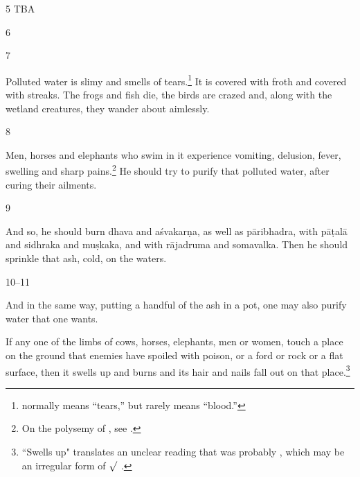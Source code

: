 \begin{translation}
\begin{itemize}
     \end{itemize}
    
    \item[5] TBA
    
    \item [6]
    
    \item[7]
    
    Polluted water is slimy and smells of tears.\footnote{ normally
means “tears,” but rarely means “blood.” }  It is covered with froth and
covered with streaks. The frogs and fish die, the birds are crazed and, along with
the wetland creatures, they wander about aimlessly.
    
     \item [8]
     
     Men, horses and elephants who swim in it experience vomiting, delusion,
fever, swelling and sharp pains.\footnote{On the polysemy of , see \cite{seme-1979}.} 
    He should try to purify that polluted water, after curing their ailments.
     
\item [9]

And so, he should burn
    \gls{dhava}  and 
    \gls{aśvakarṇa}, %
        as well as
    \gls{pāribhadra}, %
        with
    \gls{pāṭalā} %
        and 
    \gls{sidhraka} %
        and 
   \gls{muṣkaka}, %
        and with
    \gls{rājadruma} %
        and 
    \gls{somavalka}.
Then he should sprinkle that ash, cold, on the waters.

\item [10--11]

And in the same way, putting a handful of the ash in a pot, one may also purify water that 
one wants.

If any one of the limbs of cows, horses, elephants, men or women, touch a place on
the ground that enemies have spoiled with poison, or a ford or rock or a flat
surface, then it swells up and burns and its hair and nails fall out on that
place.\footnote{``Swells up" translates an unclear reading that was probably
    , which may be an irregular form of $\surd$ 
    \citep[see][175--176]{whit-root}.}


\end{translation}
